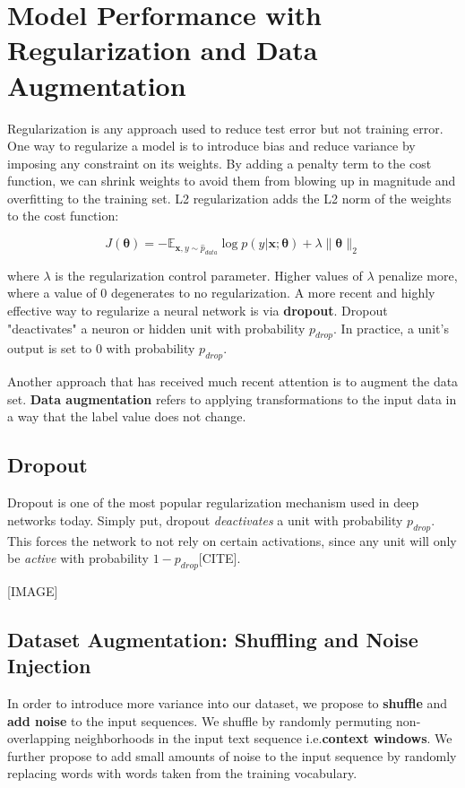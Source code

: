 
\chapter{Model Performance with Regularization and Data Augmentation}

Regularization is any approach used to reduce test error but not training error. One way
to regularize a model is to introduce bias and reduce variance by imposing any constraint on
its weights. By adding a penalty term to the cost function, we can shrink weights to avoid
them from blowing up in magnitude and overfitting to the training set. L2 regularization
adds the L2 norm of the weights to the cost function:

\[J(\bm{\theta}) = -\mathbb{E}_{\bm{x},y \sim \hat p_{data}} \log \textit{p}(y|\bm{x};\bm{\theta}) + \lambda \lVert \bm{\theta} \rVert_{2}\]

where $\lambda$ is the regularization control parameter. Higher values of $\lambda$ penalize more, where
a value of 0 degenerates to no regularization.
A more recent and highly effective way to regularize a neural network is via \textbf{dropout}.
Dropout "deactivates" a neuron or hidden unit with probability $p_{drop}$. In practice, a unit’s
output is set to 0 with probability $p_{drop}$.

Another approach that has received much recent attention is to augment the data set.
\textbf{Data augmentation} refers to applying transformations to the input data in a way that
the label value does not change.


\section{Dropout}
Dropout is one of the most popular regularization mechanism used in deep networks today.
Simply put, dropout \textit{deactivates} a unit with probability $p_{drop}$. This forces the network to not rely on certain
activations, since any unit will only be \textit{active} with probability $1-p_{drop}$[CITE].

[IMAGE]
\section{Dataset Augmentation: Shuffling and Noise Injection}
In order to introduce more variance into our dataset, we propose to \textbf{shuffle} and \textbf{add noise} to the input sequences.
We shuffle by randomly permuting non-overlapping neighborhoods in the input text sequence i.e.\textbf{context windows}.
We further propose to add small amounts of
noise to the input sequence by randomly replacing words with words taken from the training vocabulary.

